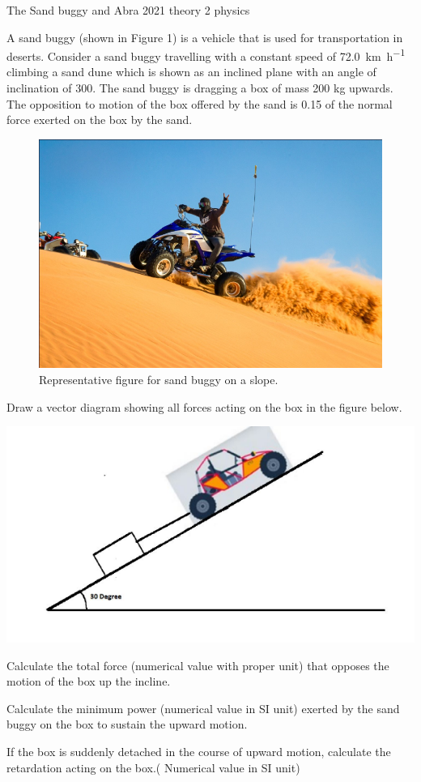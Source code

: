 \ylDisplay
{The Sand buggy and Abra}%
{2021}%
{theory}%
{2}%
{physics}%
{}%
{
\ifStatement
{}
A sand buggy (shown in Figure 1) is a vehicle that is used for transportation in deserts. Consider a sand buggy travelling with a constant speed of \SI{72.0}{\km\per\hour} climbing a sand dune which is shown as an inclined plane with an angle of inclination of 300. The sand buggy is dragging a box of mass 200 kg upwards. The opposition to motion of the box offered by the sand is \num{0.15} of the normal force exerted on the box by the sand.
\begin{figure}[!htbp]
  \centering
  \includegraphics[width=0.7\linewidth]{2021-t-02-p1}
  \caption{Representative figure for sand buggy on a slope.}
\end{figure}

\prob
Draw a vector diagram showing all forces acting on the box in the figure below.
\begin{center}
  \includegraphics[width=0.5\linewidth]{2021-t-02-p2}
\end{center}

\prob
Calculate the total force (numerical value with proper unit) that opposes the motion of the box up the incline.

\prob
Calculate the minimum power (numerical value in SI unit) exerted by the sand buggy on the box to sustain the upward motion.

\prob
If the box is suddenly detached in the course of upward motion, calculate the retardation acting on the box.( Numerical value in SI unit)

}
